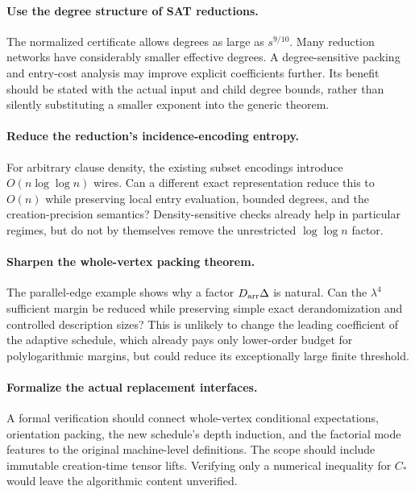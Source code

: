 \documentclass[11pt,letterpaper]{article}
\numberwithin{equation}{section}
\theoremstyle{definition}\newtheorem{definition}[theorem]{Definition}
\theoremstyle{remark}\newtheorem{remark}[theorem]{Remark}
\newcommand{\Darr}{D_{\rm arr}}
\newcommand{\Cstar}{C_*}
\begin{document}
\paragraph{Use the degree structure of SAT reductions.}
The normalized certificate allows degrees as large as $s^{9/10}$.
Many reduction networks have considerably smaller effective degrees.
A degree-sensitive packing and entry-cost analysis may improve explicit
coefficients further. Its benefit should be stated with the actual input
and child degree bounds, rather than silently substituting a smaller
exponent into the generic theorem.

\paragraph{Reduce the reduction's incidence-encoding entropy.}
For arbitrary clause density, the existing subset encodings introduce
$O(n\log\log n)$ wires. Can a different exact representation reduce this
to $O(n)$ while preserving local entry evaluation, bounded degrees, and
the creation-precision semantics? Density-sensitive checks already help
in particular regimes, but do not by themselves remove the unrestricted
$\log\log n$ factor.

\paragraph{Sharpen the whole-vertex packing theorem.}
The parallel-edge example shows why a factor $\Darr\Delta$ is natural.
Can the $\lambda^4$ sufficient margin be reduced while preserving simple
exact derandomization and controlled description sizes? This is unlikely
to change the leading coefficient of the adaptive schedule, which already
pays only lower-order budget for polylogarithmic margins, but could reduce
its exceptionally large finite threshold.

\paragraph{Formalize the actual replacement interfaces.}
A formal verification should connect whole-vertex conditional expectations,
orientation packing, the new schedule's depth induction, and the factorial
mode features to the original machine-level definitions. The scope should
include immutable creation-time tensor lifts. Verifying only a numerical
inequality for $\Cstar$ would leave the algorithmic content unverified.
\end{document}
